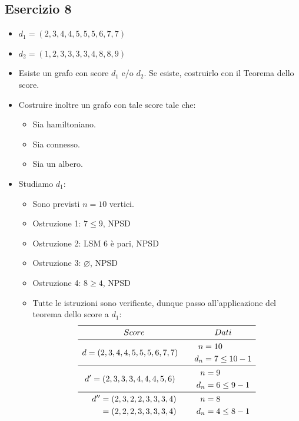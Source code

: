 \documentclass[10pt]{article}
\begin{document}
	\subsection{Esercizio 8}
	\begin{itemize}
	\item
	$d_1 = (2,3,4,4,5,5,5,6,7,7)$
	\item
	$d_2 = (1,2,3,3,3,3,4,8,8,9)$
	\item
	Esiste un grafo con score $d_1$ e/o $d_2$. Se esiste, costruirlo con il Teorema dello score.
	\item
	Costruire inoltre un grafo con tale score tale che:
	\begin{itemize}
	\item
	Sia hamiltoniano.
	\item
	Sia connesso.
	\item
	Sia un albero.
	\end{itemize}
	\item
	Studiamo $d_1$:
	\begin{itemize}
	\item
	Sono previsti $n=10$ vertici.
	\item
	Ostruzione 1: $7 \leq 9$, NPSD
	\item
	Ostruzione 2: LSM $6$ è pari, NPSD
	\item
	Ostruzione 3: $\varnothing$, NPSD
	\item
	Ostruzione 4: $8 \geq 4$, NPSD
	\item
	Tutte le istruzioni sono verificate, dunque passo all'applicazione del teorema dello score a $d_1$:
	\[
	\begin{array}{cc}
		\toprule
		Score & Dati \\
		\midrule
		\begin{split} d &= (2,3,4,4,5,5,5,6,7,7) \end{split} & \begin{split} n &= 10 \\ d_n &= 7 \leq 10 -1 \end{split} \\
		\midrule
		\begin{split} d' &= (2,3,3,3,4,4,4,5,6) \end{split} & \begin{split} n &= 9 \\ d_n &= 6 \leq 9 -1 \end{split} \\
		\midrule
		\begin{split} d'' &= (2,3,2,2,3,3,3,4) \\ &= (2,2,2,3,3,3,3,4) \end{split} & \begin{split} n &= 8 \\ d_n &= 4 \leq 8 -1 \end{split} \\

\end{array}\]
\end{itemize}
\end{itemize}
\end{document}
